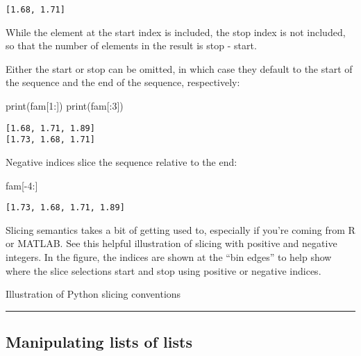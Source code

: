 \documentclass[
  letterpaper,
  DIV=11,
  numbers=noendperiod]{scrreprt}
\newenvironment{Shaded}{\begin{snugshade}}{\end{snugshade}}
\newcommand{\BuiltInTok}[1]{\textcolor[rgb]{0.00,0.23,0.31}{#1}}
\newcommand{\DecValTok}[1]{\textcolor[rgb]{0.68,0.00,0.00}{#1}}
\newcommand{\NormalTok}[1]{\textcolor[rgb]{0.00,0.23,0.31}{#1}}
\newcommand{\OperatorTok}[1]{\textcolor[rgb]{0.37,0.37,0.37}{#1}}
\begin{document}
\begin{verbatim}
[1.68, 1.71]
\end{verbatim}

While the element at the start index is included, the stop index is not
included, so that the number of elements in the result is stop - start.

Either the start or stop can be omitted, in which case they default to
the start of the sequence and the end of the sequence, respectively:

\begin{Shaded}
\begin{Highlighting}[]
\BuiltInTok{print}\NormalTok{(fam[}\DecValTok{1}\NormalTok{:])}
\BuiltInTok{print}\NormalTok{(fam[:}\DecValTok{3}\NormalTok{])}
\end{Highlighting}
\end{Shaded}

\begin{verbatim}
[1.68, 1.71, 1.89]
[1.73, 1.68, 1.71]
\end{verbatim}

Negative indices slice the sequence relative to the end:

\begin{Shaded}
\begin{Highlighting}[]
\NormalTok{fam[}\OperatorTok{{-}}\DecValTok{4}\NormalTok{:]}
\end{Highlighting}
\end{Shaded}

\begin{verbatim}
[1.73, 1.68, 1.71, 1.89]
\end{verbatim}

Slicing semantics takes a bit of getting used to, especially if you're
coming from R or MATLAB. See this helpful illustration of slicing with
positive and negative integers. In the figure, the indices are shown at
the ``bin edges'' to help show where the slice selections start and stop
using positive or negative indices.

Illustration of Python slicing conventions

\begin{center}\rule{0.5\linewidth}{0.5pt}\end{center}

\hypertarget{manipulating-lists-of-lists}{%
\subsection{Manipulating lists of
lists}\label{manipulating-lists-of-lists}}
\end{document}

